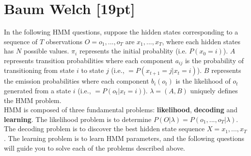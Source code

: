 \section{Baum Welch [19pt]}
In the following HMM questions, suppose the hidden states corresponding to a sequence of $T$ observations $O=o_1, ..., o_T$ are $x_1, ..., x_T$, where each hidden states has $N$ possible values. $\pi_i$ represents the initial probablity (i.e. $P(x_0=i)$). $A$ represents transition probabilities where each component $a_{ij}$ is the probability of transitioning from state $i$ to state $j$ (i.e., $=P(x_{t+1}=j|x_t=i)$). $B$ represents the emission probabilities where each component $b_i(o_t)$ is the likelihood of $o_t$ generated from a state $i$ (i.e., $=P(o_t|x_t=i)$). $\lambda=(A,B)$ uniquely defines the HMM problem. \\
HMM is composed of three fundamental problems: \textbf{likelihood}, \textbf{decoding} and \textbf{learning}. The likelihood problem is to determine $P(O|\lambda)=P(o_1, ..., o_T|\lambda)$. The decoding problem is to discover the best hidden state sequence $X=x_1, ..., x_T$. The learning problem is to learn HMM parameters, and the following questions will guide you to solve each of the problems described above.


